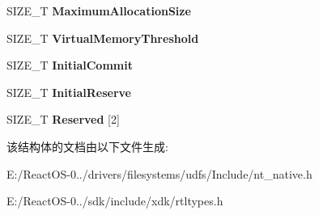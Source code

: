 \begin{DoxyCompactItemize}
S\+I\+Z\+E\+\_\+T {\bfseries Maximum\+Allocation\+Size}
\item 
\mbox{\label{struct___r_t_l___h_e_a_p___p_a_r_a_m_e_t_e_r_s_a6dcadb13d4dd718235da58d1c7d4b306}} 
S\+I\+Z\+E\+\_\+T {\bfseries Virtual\+Memory\+Threshold}
\item 
\mbox{\label{struct___r_t_l___h_e_a_p___p_a_r_a_m_e_t_e_r_s_a3f2b8c28c3800bccb05f96239ba55b63}} 
S\+I\+Z\+E\+\_\+T {\bfseries Initial\+Commit}
\item 
\mbox{\label{struct___r_t_l___h_e_a_p___p_a_r_a_m_e_t_e_r_s_a592047f0ca57a0217a6c8f592e1b3a05}} 
S\+I\+Z\+E\+\_\+T {\bfseries Initial\+Reserve}
\item 
\mbox{\label{struct___r_t_l___h_e_a_p___p_a_r_a_m_e_t_e_r_s_a5457a407dd2122ff6a00e165c0fd60a7}} 
S\+I\+Z\+E\+\_\+T {\bfseries Reserved} \mbox{[}2\mbox{]}
\end{DoxyCompactItemize}


该结构体的文档由以下文件生成\+:\begin{DoxyCompactItemize}
\item 
E\+:/\+React\+O\+S-\/0../drivers/filesystems/udfs/\+Include/nt\+\_\+native.\+h\item 
E\+:/\+React\+O\+S-\/0../sdk/include/xdk/rtltypes.\+h\end{DoxyCompactItemize}

